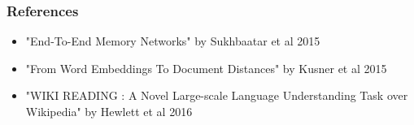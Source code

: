 \documentclass{beamer}
\begin{document}

\begin{frame}
\frametitle{References}
\begin{itemize}
\item "End-To-End Memory Networks" by Sukhbaatar et al 2015
\item "From Word Embeddings To Document Distances" by Kusner et al 2015 
\item "WIKI READING : A Novel Large-scale Language Understanding Task over Wikipedia" by Hewlett et al 2016
\end{itemize}
\end{frame}
\end{document}
